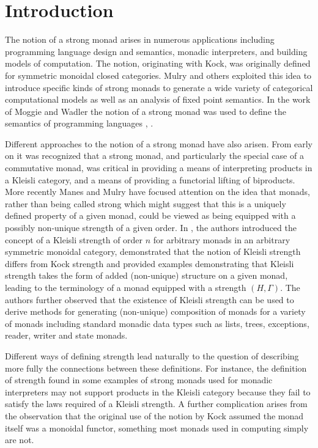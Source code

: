 \documentclass[submission,copyright]{eptcs}
\begin{document}
\section{Introduction}
The notion of a strong monad arises in numerous applications including programming language design and semantics, monadic interpreters, and building models of computation. The notion, originating with Kock\cite{articleB}, was originally defined for symmetric monoidal closed categories. Mulry and others exploited this idea to introduce specific kinds of strong monads to generate a wide variety of categorical computational models as well as an analysis of fixed point semantics\cite{articleM}.  In the work of Moggie and Wadler the notion of a strong monad was used to define the semantics of programming languages \cite{articleI}, \cite{articleL}. 

Different approaches to the notion of a strong monad have also arisen. From early on it was recognized that a strong monad, and particularly the special case of a commutative monad, was critical in providing a means of interpreting products in a Kleisli category, and a means of providing a functorial lifting of biproducts. More recently Manes and Mulry have focused attention on the idea that monads, rather than being called strong which might suggest that this is a uniquely defined property of a given monad, could be viewed as being equipped with a possibly non-unique strength of a given order. In  \cite{articleD}, the authors introduced the concept of a Kleisli strength of order $n$ for arbitrary  monads in an arbitrary symmetric monoidal category, demonstrated that the notion of Kleisli strength differs from Kock strength and provided examples demonstrating that Kleisli strength takes the form of added (non-unique) structure on a given monad, leading to the terminology of a monad equipped with a strength $(H,\Gamma)$. The authors further observed that the existence of Kleisli strength can be used to derive methods for generating (non-unique) composition of monads for a variety of monads including standard monadic data types such as lists, trees, exceptions, reader, writer and state monads.

Different ways of defining strength lead naturally to the question of describing more fully the connections between these definitions. For instance, the definition of strength found in some examples of strong monads used for monadic interpreters may not support products in the Kleisli category because they fail to satisfy the laws required of a Kleisli strength. A further complication arises from the observation that the original use of the notion by Kock assumed the monad itself was a monoidal functor, something most monads used in computing simply are not. 
\end{document}
